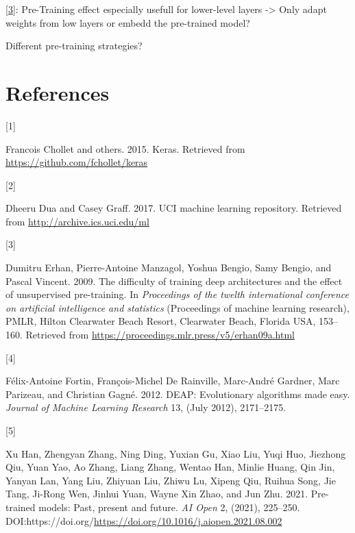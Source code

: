 \documentclass[
  11pt,
]{article}
\newlength{\cslhangindent}
\newlength{\csllabelwidth}
\newlength{\cslentryspacingunit} %
\newenvironment{CSLReferences}[2] %
 {%
  \setlength{\parindent}{0pt}
  \ifodd #1
  \let\oldpar\par
  \def\par{\hangindent=\cslhangindent\oldpar}
  \fi
  \setlength{\parskip}{#2\cslentryspacingunit}
 }%
 {}
\newcommand{\CSLLeftMargin}[1]{\parbox[t]{\csllabelwidth}{#1}}
\newcommand{\CSLRightInline}[1]{\parbox[t]{\linewidth - \csllabelwidth}{#1}\break}
\begin{document}
{[}\protect\hyperlink{ref-pmlr-v5-erhan09a}{3}{]}: Pre-Training effect especially usefull for lower-level layers -\textgreater{} Only adapt weights from low layers or embedd the pre-trained model?

Different pre-training strategies?

\newpage

\hypertarget{I}{%
\section*{References}\label{I}}

\hypertarget{refs}{}
\begin{CSLReferences}{0}{0}
\leavevmode{}%
\CSLLeftMargin{{[}1{]} }%
\CSLRightInline{Francois Chollet and others. 2015. Keras. Retrieved from \url{https://github.com/fchollet/keras}}

\leavevmode{}%
\CSLLeftMargin{{[}2{]} }%
\CSLRightInline{Dheeru Dua and Casey Graff. 2017. {UCI} machine learning repository. Retrieved from \url{http://archive.ics.uci.edu/ml}}

\leavevmode{}%
\CSLLeftMargin{{[}3{]} }%
\CSLRightInline{Dumitru Erhan, Pierre-Antoine Manzagol, Yoshua Bengio, Samy Bengio, and Pascal Vincent. 2009. The difficulty of training deep architectures and the effect of unsupervised pre-training. In \emph{Proceedings of the twelth international conference on artificial intelligence and statistics} (Proceedings of machine learning research), PMLR, Hilton Clearwater Beach Resort, Clearwater Beach, Florida USA, 153--160. Retrieved from \url{https://proceedings.mlr.press/v5/erhan09a.html}}

\leavevmode{}%
\CSLLeftMargin{{[}4{]} }%
\CSLRightInline{Félix-Antoine Fortin, François-Michel De Rainville, Marc-André Gardner, Marc Parizeau, and Christian Gagné. 2012. {DEAP}: Evolutionary algorithms made easy. \emph{Journal of Machine Learning Research} 13, (July 2012), 2171--2175.}

\leavevmode{}%
\CSLLeftMargin{{[}5{]} }%
\CSLRightInline{Xu Han, Zhengyan Zhang, Ning Ding, Yuxian Gu, Xiao Liu, Yuqi Huo, Jiezhong Qiu, Yuan Yao, Ao Zhang, Liang Zhang, Wentao Han, Minlie Huang, Qin Jin, Yanyan Lan, Yang Liu, Zhiyuan Liu, Zhiwu Lu, Xipeng Qiu, Ruihua Song, Jie Tang, Ji-Rong Wen, Jinhui Yuan, Wayne Xin Zhao, and Jun Zhu. 2021. Pre-trained models: Past, present and future. \emph{AI Open} 2, (2021), 225--250. DOI:https://doi.org/\url{https://doi.org/10.1016/j.aiopen.2021.08.002}}


\end{CSLReferences}
\end{document}
